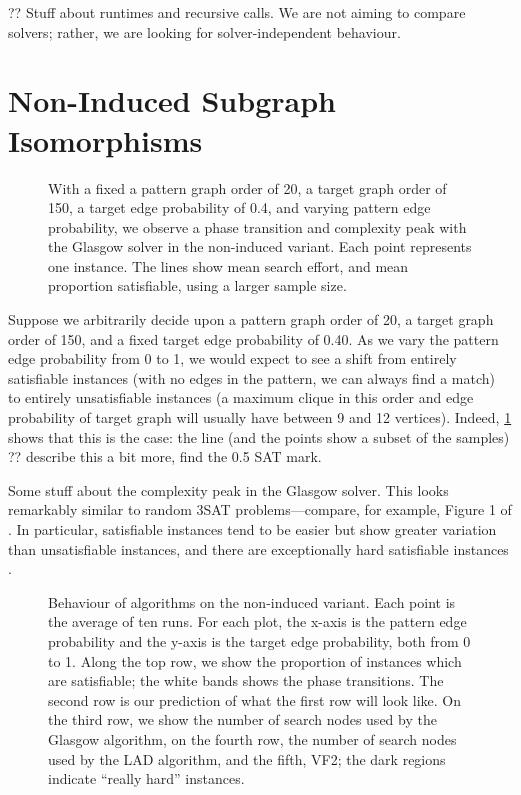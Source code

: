 \documentclass[letterpaper]{article}
\begin{document}
?? Stuff about runtimes and recursive calls. We are not aiming to compare solvers; rather, we are
looking for solver-independent behaviour.

\section{Non-Induced Subgraph Isomorphisms}

\begin{figure}[tb]
    
    \caption{With a fixed a pattern graph order of 20, a target graph order of 150, a target edge
        probability of 0.4, and varying pattern edge probability, we observe a phase transition and
        complexity peak with the Glasgow solver in the non-induced variant. Each point represents
        one instance. The lines show mean search effort, and mean proportion satisfiable, using a
    larger sample size.}
    \label{figure:phase-transition}
\end{figure}

Suppose we arbitrarily decide upon a pattern graph order of 20, a target graph order of 150, and a
fixed target edge probability of 0.40. As we vary the pattern edge probability from 0 to 1, we would
expect to see a shift from entirely satisfiable instances (with no edges in the pattern, we can
always find a match) to entirely unsatisfiable instances (a maximum clique in this order and edge
probability of target graph will usually have between 9 and 12 vertices). Indeed,
\cref{figure:phase-transition} shows that this is the case: the line (and the points show a subset
of the samples) ?? describe this a bit more, find the 0.5 SAT mark.

Some stuff about the complexity peak in the Glasgow solver. This looks remarkably similar to random
3SAT problems---compare, for example, Figure 1 of \citet{LeytonBrown:2014}. In particular,
satisfiable instances tend to be easier but show greater variation than unsatisfiable instances, and
there are exceptionally hard satisfiable instances \citep{Smith:1997}.

\begin{figure}[tb]
    
    \caption{Behaviour of algorithms on the non-induced variant. Each point is the average of ten
        runs. For each plot, the x-axis is the pattern edge probability and the y-axis is the target
        edge probability, both from 0 to 1. Along the top row, we show the proportion of instances which are
        satisfiable; the white bands shows the phase transitions. The second row is our prediction
        of what the first row will look like. On the third row, we show the number of search nodes
        used by the Glasgow algorithm, on the fourth row, the number of search nodes used by the LAD
        algorithm, and the fifth, VF2; the dark regions indicate ``really hard'' instances.}
    \label{figure:non-induced}
\end{figure}
\end{document}
